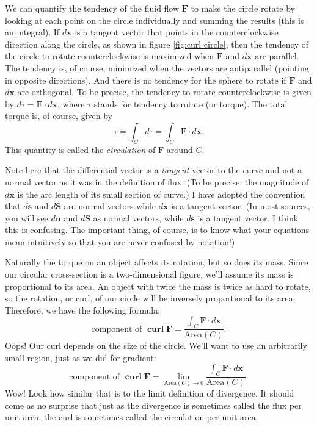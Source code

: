 \documentclass{myarticle}
\DeclareMathOperator{\curl}{\mathbf{curl}}
\renewcommand{\vec}[1]{\mathbf{#1}}
\theoremstyle{nospace}
\newtheorem{old series theorem}{Theorem}
\newenvironment{series theorem}{\begin{mdframed}\begin{old series theorem}}{\end{old series theorem}\end{mdframed}}
\begin{document}
We can quantify the tendency of the fluid flow $\vec{F}$ to make the circle rotate by looking at each point on the circle individually and summing the results (this is an integral). If $d\vec{x}$ is a tangent vector that points in the counterclockwise direction along the circle, as shown in figure \ref{fig:curl circle}, then the tendency of the circle to rotate counterclockwise is maximized when $\vec{F}$ and $d\vec{x}$ are parallel. The tendency is, of course, minimized when the vectors are antiparallel (pointing in opposite directions). And there is no tendency for the sphere to rotate if $\vec{F}$ and $d\vec{x}$ are orthogonal. To be precise, the tendency to rotate counterclockwise is given by $d\tau = \vec{F} \cdot d\vec{x}$, where $\tau$ stands for tendency to rotate (or torque). The total torque is, of course, given by \[ \tau = \int_C d\tau = \int_C \vec{F} \cdot d\vec{x}. \] This quantity is called the \textit{circulation} of $\text{F}$ around $C$.

Note here that the differential vector is a \textit{tangent} vector to the curve and not a normal vector as it was in the definition of flux. (To be precise, the magnitude of $d\vec{x}$ is the arc length of its small section of curve.) I have adopted the convention that $d\vec{s}$ and $d\vec{S}$ are normal vectors while $d\vec{x}$ is a tangent vector. (In most sources, you will see $d\vec{n}$ and $d\vec{S}$ as normal vectors, while $d\vec{s}$ is a tangent vector. I think this is confusing. The important thing, of course, is to know what your equations mean intuitively so that you are never confused by notation!)

Naturally the torque on an object affects its rotation, but so does its mass. Since our circular cross-section is a two-dimensional figure, we'll assume its mass is proportional to its area. An object with twice the mass is twice as hard to rotate, so the rotation, or curl, of our circle will be inversely proportional to its area. Therefore, we have the following formula: \[ \text{component of }\curl \vec{F} = \frac{\int_C \vec{F} \cdot d\vec{x}}{\text{Area}(C)}. \] Oops! Our curl depends on the size of the circle. We'll want to use an arbitrarily small region, just as we did for gradient: \[ \text{component of }\curl \vec{F} = \lim_{\text{Area}(C) \to 0} \frac{\int_C \vec{F} \cdot d\vec{x}}{\text{Area}(C)}. \] Wow! Look how similar that is to the limit definition of divergence. It should come as no surprise that just as the divergence is sometimes called the flux per unit area, the curl is sometimes called the circulation per unit area.
\end{document}
